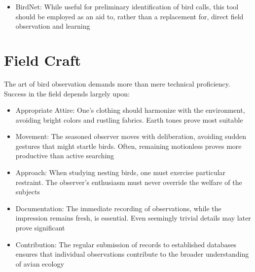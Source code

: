 \documentclass[a4paper,12pt,landscape]{memoir}
\begin{document}
{\begin{itemize}
  \item BirdNet: While useful for preliminary identification of bird calls, this tool should be employed as an aid to, rather than a replacement for, direct field observation and learning
  \end{itemize}
}{%
  \section*{Field Craft}
  The art of bird observation demands more than mere technical proficiency. Success in the field depends largely upon:
  \begin{itemize}
  \item Appropriate Attire: One's clothing should harmonize with the environment, avoiding bright colors and rustling fabrics. Earth tones prove most suitable
  
  \item Movement: The seasoned observer moves with deliberation, avoiding sudden gestures that might startle birds. Often, remaining motionless proves more productive than active searching
  
  \item Approach: When studying nesting birds, one must exercise particular restraint. The observer's enthusiasm must never override the welfare of the subjects
  
  \item Documentation: The immediate recording of observations, while the impression remains fresh, is essential. Even seemingly trivial details may later prove significant
  
  \item Contribution: The regular submission of records to established databases ensures that individual observations contribute to the broader understanding of avian ecology
  \end{itemize}
}
\end{document}
